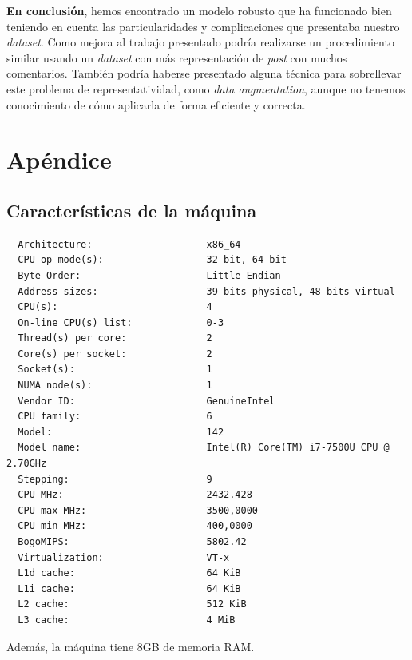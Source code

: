 \documentclass[11pt]{article}
\begin{document}
\textbf{En conclusión}, hemos encontrado un modelo robusto que ha funcionado bien teniendo en cuenta las particularidades y complicaciones que presentaba nuestro \emph{dataset}. Como mejora al trabajo presentado podría realizarse un procedimiento similar usando un \emph{dataset} con más representación de \emph{post} con muchos comentarios. También podría haberse presentado alguna técnica para sobrellevar este problema de representatividad, como \emph{data augmentation}, aunque no tenemos conocimiento de cómo aplicarla de forma eficiente y correcta.

\pagebreak
\section{Apéndice} \label{apendice}

\subsection{Características de la máquina}

\begin{lstlisting}
  Architecture:                    x86_64
  CPU op-mode(s):                  32-bit, 64-bit
  Byte Order:                      Little Endian
  Address sizes:                   39 bits physical, 48 bits virtual
  CPU(s):                          4
  On-line CPU(s) list:             0-3
  Thread(s) per core:              2
  Core(s) per socket:              2
  Socket(s):                       1
  NUMA node(s):                    1
  Vendor ID:                       GenuineIntel
  CPU family:                      6
  Model:                           142
  Model name:                      Intel(R) Core(TM) i7-7500U CPU @ 2.70GHz
  Stepping:                        9
  CPU MHz:                         2432.428
  CPU max MHz:                     3500,0000
  CPU min MHz:                     400,0000
  BogoMIPS:                        5802.42
  Virtualization:                  VT-x
  L1d cache:                       64 KiB
  L1i cache:                       64 KiB
  L2 cache:                        512 KiB
  L3 cache:                        4 MiB
  \end{lstlisting}

Además, la máquina tiene 8GB de memoria RAM.

\pagebreak


\end{document}
